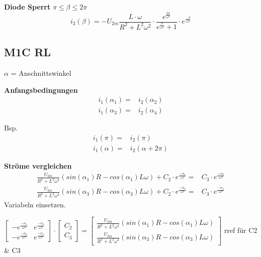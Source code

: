 \textbf{Diode Sperrt} $ \pi \leq \beta \leq 2\pi $\newline
\[ i_2(\beta) = -U_{2m} \frac{L \cdot \omega}{R^2 + L^2\omega^2} \cdot  \frac{e^{\frac{2\pi}{\omega \tau}}}{e^{\frac{\pi}{\omega \tau}} +1} \cdot e^{\frac{-\beta}{\omega \tau}} \]
\clearpage


\subsection{M1C RL}
$ \alpha $ = Anschnittswinkel \newline
\begin{minipage}{8cm}
    \textbf{Anfangsbedingungen}
    \begin{align*}
        i_1(\alpha_1) = & i_2(\alpha_2)\\
        i_1(\alpha_3)  = & i_2(\alpha_4)
    \end{align*}
\end{minipage}
\begin{minipage}{8cm}
    Bsp.
    \begin{align*}
    i_1(\pi) = & i_2(\pi)\\
    i_1(\alpha)  = & i_2(\alpha + 2\pi)
    \end{align*}
\end{minipage}

\textbf{Ströme vergleichen}
\begin{align*}
 \frac{U_{2m}}{R^2 + L^2\omega^2}\left(sin(\alpha_1) R - cos(\alpha_1) L\omega\right) + C_2 \cdot e^{\frac{-\alpha_1}{\omega \tau}} = & C_3 \cdot e^{\frac{-\alpha_2}{\omega \tau}}\\
 \frac{U_{2m}}{R^2 + L^2\omega^2}\left(sin(\alpha_3) R - cos(\alpha_3) L\omega\right) + C_2 \cdot e^{\frac{-\alpha_3}{\omega \tau}} = & C_3 \cdot e^{\frac{-\alpha_4}{\omega \tau}} 
\end{align*}
Variabeln einsetzen.\newline
\begin{minipage}{\linewidth}
    $
    \begin{bmatrix}
        -e^{\frac{-\alpha_1}{\omega \tau}}       &e^{\frac{-\alpha_2}{\omega \tau}} \\
        -e^{\frac{-\alpha_3}{\omega \tau}}       &e^{\frac{-\alpha_4}{\omega \tau}}
    \end{bmatrix} 
    \cdot
    \begin{bmatrix}
        C_2\\
        C_3
    \end{bmatrix} 
    =
    \begin{bmatrix}
        \frac{U_{2m}}{R^2 + L^2\omega^2}\left(sin(\alpha_1) R - cos(\alpha_1) L\omega\right)\\
        \frac{U_{2m}}{R^2 + L^2\omega^2}\left(sin(\alpha_3) R - cos(\alpha_3) L\omega\right)
    \end{bmatrix} 
    $ \newline
    rref für C2 \& C3 \\
\end{minipage}

